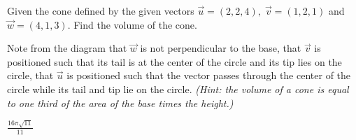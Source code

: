 \begin{Exercise}[
name={},
title={}, 
difficulty=0,
origin={\cite{YL}}]
Given the cone defined by the given vectors $\vec{u}=(2,2,4),\; \vec{v}=(1,2,1)$ and $\vec{w}=(4,1,3)$.  Find the volume of the cone.
\begin{multicols}{2}
Note from the diagram that $\vec{w}$ is not perpendicular to the base,
that $\vec{v}$ is positioned such that its tail is at the center of the circle and its tip lies on the circle,
that $\vec{u}$ is positioned such that the vector passes through the center of the circle while its tail and tip lie on the circle.
\textit{(Hint: the volume of a cone is equal to one third of the area of the base times the height.)}
\EndCurrentQuestion
\end{multicols}
\end{Exercise}

\begin{Answer}
$\frac{16\pi\sqrt{11}}{11}$
\end{Answer}
